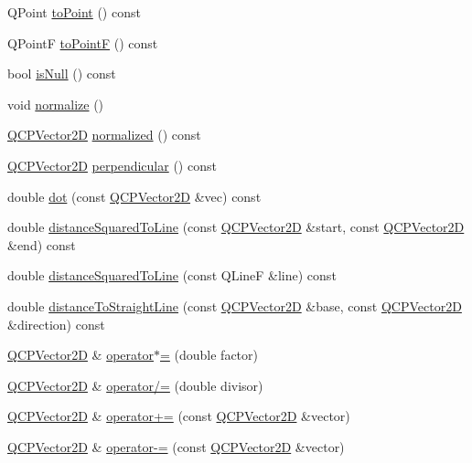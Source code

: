 \begin{DoxyCompactItemize}
\item 
Q\+Point \hyperlink{classQCPVector2D_add3edf75de9b7bf1abc693b973b2e906}{to\+Point} () const
\item 
Q\+PointF \hyperlink{classQCPVector2D_acd7af3f4a62833ada58be3f3021dbbac}{to\+PointF} () const
\item 
bool \hyperlink{classQCPVector2D_ace99f200b347b14864808213eef16593}{is\+Null} () const
\item 
void \hyperlink{classQCPVector2D_ad83268be370685c2a0630acc0fb1a425}{normalize} ()
\item 
\hyperlink{classQCPVector2D}{Q\+C\+P\+Vector2D} \hyperlink{classQCPVector2D_a707bb3af3b1f9331a2450ec75eaf7eb0}{normalized} () const
\item 
\hyperlink{classQCPVector2D}{Q\+C\+P\+Vector2D} \hyperlink{classQCPVector2D_a0e08d09f9027784237e302e32290b001}{perpendicular} () const
\item 
double \hyperlink{classQCPVector2D_a39f8d28db7dbffcca6aa63a1f1f6e176}{dot} (const \hyperlink{classQCPVector2D}{Q\+C\+P\+Vector2D} \&vec) const
\item 
double \hyperlink{classQCPVector2D_a14840cd3da80cfee4eb3f8977cab89ab}{distance\+Squared\+To\+Line} (const \hyperlink{classQCPVector2D}{Q\+C\+P\+Vector2D} \&start, const \hyperlink{classQCPVector2D}{Q\+C\+P\+Vector2D} \&end) const
\item 
double \hyperlink{classQCPVector2D_a0c44ca97d46ee04feec32c1c57e70831}{distance\+Squared\+To\+Line} (const Q\+LineF \&line) const
\item 
double \hyperlink{classQCPVector2D_ae240b845c3744e43a5d0aa7b2bb66c19}{distance\+To\+Straight\+Line} (const \hyperlink{classQCPVector2D}{Q\+C\+P\+Vector2D} \&base, const \hyperlink{classQCPVector2D}{Q\+C\+P\+Vector2D} \&direction) const
\item 
\hyperlink{classQCPVector2D}{Q\+C\+P\+Vector2D} \& \hyperlink{classQCPVector2D_aa52a246d168f475a4231c7bdfdac7df1}{operator$\ast$=} (double factor)
\item 
\hyperlink{classQCPVector2D}{Q\+C\+P\+Vector2D} \& \hyperlink{classQCPVector2D_aefa55eb9282c066a330ca281881e0ec0}{operator/=} (double divisor)
\item 
\hyperlink{classQCPVector2D}{Q\+C\+P\+Vector2D} \& \hyperlink{classQCPVector2D_aa2c34754ce8839b2d074dec741783c5e}{operator+=} (const \hyperlink{classQCPVector2D}{Q\+C\+P\+Vector2D} \&vector)
\item 
\hyperlink{classQCPVector2D}{Q\+C\+P\+Vector2D} \& \hyperlink{classQCPVector2D_a3a2e906bb924983bb801e89f28a3d566}{operator-\/=} (const \hyperlink{classQCPVector2D}{Q\+C\+P\+Vector2D} \&vector)
\end{DoxyCompactItemize}
